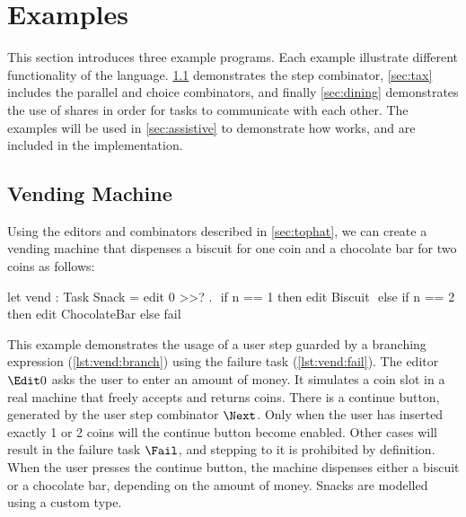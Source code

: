 
\section{Examples}
\label{sec:examples}

This section introduces three example \TOPHAT programs.
Each example illustrate different functionality of the \TOPHAT language.
\cref{sec:vending} demonstrates the step combinator, \cref{sec:tax} includes the parallel and choice combinators, and finally \cref{sec:dining} demonstrates the use of shares in order for tasks to communicate with each other.
The examples will be used in \cref{sec:assistive} to demonstrate how \ASTOPHAT works, and are included in the implementation.


\subsection{Vending Machine}
\label{sec:vending}

Using the editors and combinators described in \cref{sec:tophat},
we can create a vending machine that dispenses a biscuit for one coin and a chocolate bar for two coins as follows:


\begin{TASK}[
    float=ht,
    numbers=right,
    caption={Vending machine dispensing biscuits or chocolate.},
    captionpos=b,
    label=lst:vending]
  let vend : Task Snack = edit 0 >>? \n.    $\label{lst:vend:enter}$
    if n == 1 then edit Biscuit             $\label{lst:vend:branch}$
    else if n == 2 then edit ChocolateBar
    else fail                               $\label{lst:vend:fail}$
\end{TASK}

This example demonstrates the usage of a user step guarded by a branching expression (\cref{lst:vend:branch}) using the failure task (\cref{lst:vend:fail}).
The editor $\Edit 0$ asks the user to enter an amount of money.
It simulates a coin slot in a real machine that freely accepts and returns coins.
There is a continue button, generated by the user step combinator $\Next$.
Only when the user has inserted exactly 1 or 2 coins will the continue button become enabled.
Other cases will result in the failure task $\Fail$, and stepping to it is prohibited by definition.
When the user presses the continue button, the machine dispenses either a biscuit or a chocolate bar, depending on the amount of money.
Snacks are modelled using a custom type.



